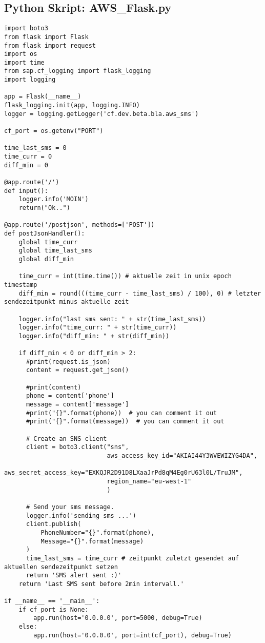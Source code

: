 \subsection{Python Skript: AWS\_Flask.py}
\begin{lstlisting}
import boto3
from flask import Flask
from flask import request
import os
import time
from sap.cf_logging import flask_logging
import logging

app = Flask(__name__)
flask_logging.init(app, logging.INFO)
logger = logging.getLogger('cf.dev.beta.bla.aws_sms')

cf_port = os.getenv("PORT")

time_last_sms = 0
time_curr = 0
diff_min = 0

@app.route('/')
def input():
    logger.info('MOIN')
    return("Ok..")

@app.route('/postjson', methods=['POST'])
def postJsonHandler():
    global time_curr
    global time_last_sms
    global diff_min

    time_curr = int(time.time()) # aktuelle zeit in unix epoch timestamp
    diff_min = round(((time_curr - time_last_sms) / 100), 0) # letzter sendezeitpunkt minus aktuelle zeit

    logger.info("last sms sent: " + str(time_last_sms))
    logger.info("time_curr: " + str(time_curr))
    logger.info("diff_min: " + str(diff_min))

    if diff_min < 0 or diff_min > 2:
      #print(request.is_json)
      content = request.get_json()

      #print(content)
      phone = content['phone']
      message = content['message']
      #print("{}".format(phone))  # you can comment it out
      #print("{}".format(message))  # you can comment it out

      # Create an SNS client
      client = boto3.client("sns",
                            aws_access_key_id="AKIAI44Y3WVEWIZYG4DA",
                            aws_secret_access_key="EXKQJR2D91D8LXaaJrPd8qM4Eg0rU63l0L/TruJM",
                            region_name="eu-west-1"
                            )

      # Send your sms message.
      logger.info('sending sms ...')
      client.publish(
          PhoneNumber="{}".format(phone),
          Message="{}".format(message)
      )
      time_last_sms = time_curr # zeitpunkt zuletzt gesendet auf aktuellen sendezeitpunkt setzen
      return 'SMS alert sent :)'
    return 'Last SMS sent before 2min intervall.'

if __name__ == '__main__':
    if cf_port is None:
        app.run(host='0.0.0.0', port=5000, debug=True)
    else:
        app.run(host='0.0.0.0', port=int(cf_port), debug=True)
\end{lstlisting}


